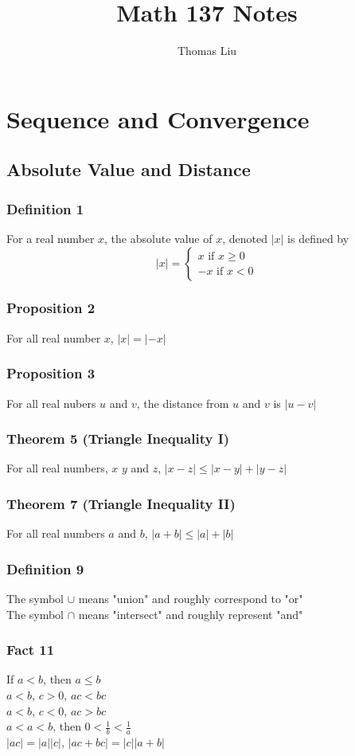 \documentclass[12pt, letterpaper]{article}
\title{Math 137 Notes}
\author{Thomas Liu}
\begin{document}
\maketitle
\tableofcontents

\newpage

\section{Sequence and Convergence}
\subsection{Absolute Value and Distance}
\subsubsection*{Definition 1}
For a real number $x$, the absolute value of $x$, denoted $|x|$ is defined by
$$|x| =
\begin{cases}
    x \text{ if } x \geq 0 \\
    -x \text{ if } x < 0
\end{cases}$$
\subsubsection*{Proposition 2}
For all real number $x$, $|x| = |-x|$
\subsubsection*{Proposition 3}
For all real nubers $u$ and $v$, the distance from $u$ and $v$ is $|u - v|$
\subsubsection*{Theorem 5 (Triangle Inequality I)}
For all real numbers, $x$ $y$ and $z$, $|x -z| \leq |x - y| + |y - z|$
\subsubsection*{Theorem 7 (Triangle Inequality II)}
For all real numbers $a$ and $b$, $|a+b| \leq |a| + |b|$
\subsubsection*{Definition 9}
The symbol $\cup$ means "union" and roughly correspond to "or" \\
The symbol $\cap$ means "intersect" and roughly represent "and"
\subsubsection*{Fact 11}
If $a < b$, then $a \leq b$ \\
$a < b$, $c > 0$, $ac < bc$ \\
$a < b$, $c < 0$, $ac > bc$ \\
$a < a < b$, then $0 < \frac{1}{b} < \frac{1}{a}$ \\
$|ac| = |a||c|$, $|ac+bc| = |c||a+b|$
\end{document}
